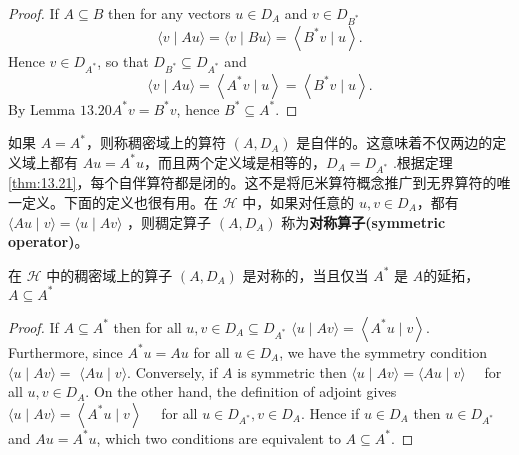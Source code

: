 \begin{proof}

If \(A \subseteq B\) then for any vectors \(u \in D_{A}\) and \(v \in D_{B^{*}}\)
\[
\langle v \mid A u\rangle=\langle v \mid B u\rangle=\left\langle B^{*} v \mid u\right\rangle .
\]
Hence \(v \in D_{A^{*}}\), so that \(D_{B^{*}} \subseteq D_{A^{*}}\) and
\[
\langle v \mid A u\rangle=\left\langle A^{*} v \mid u\right\rangle=\left\langle B^{*} v \mid u\right\rangle .
\]
By Lemma \(13.20 A^{*} v=B^{*} v\), hence \(B^{*} \subseteq A^{*}\).
    
\end{proof}
如果 \(A=A^{*}\)，则称稠密域上的算符 \(\left(A, D_{A}\right)\) 是自伴的。这意味着不仅两边的定义域上都有 \(A u=A^{*} u\)，而且两个定义域是相等的，\(D_{A}=D_{A^{*}}\) .根据定理 \ref{thm:13.21}，每个自伴算符都是闭的。这不是将厄米算符概念推广到无界算符的唯一定义。下面的定义也很有用。在 \(\mathcal{H}\) 中，如果对任意的 \(u, v \in D_{A}\)，都有 \(\langle A u \mid v\rangle=\langle u \mid A v\rangle\) ，则稠定算子 \(\left(A, D_{A}\right)\) 称为\textbf{对称算子(symmetric operator)}。
\begin{theorem}
    在 \(\mathcal{H}\) 中的稠密域上的算子 \(\left(A, D_{A}\right)\) 是对称的，当且仅当 \(A^{*}\) 是 \(A\)的延拓，\(A \subseteq A^{*}\) \label{thm:13.23}
\end{theorem}
\begin{proof}
If \(A \subseteq A^{*}\) then for all \(u, v \in D_{A} \subseteq D_{A^{*}}\)
\(\langle u \mid A v\rangle=\left\langle A^{*} u \mid v\right\rangle .\)
Furthermore, since \(A^{*} u=A u\) for all \(u \in D_{A}\), we have the symmetry condition \(\langle u \mid A v\rangle=\)
\(\langle A u \mid v\rangle\).
Conversely, if \(A\) is symmetric then
\(\langle u \mid A v\rangle=\langle A u \mid v\rangle \quad\) for all \(u, v \in D_{A} .\)
On the other hand, the definition of adjoint gives
\(\langle u \mid A v\rangle=\left\langle A^{*} u \mid v\right\rangle \quad\) for all \(u \in D_{A^{*}}, v \in D_{A}\).
Hence if \(u \in D_{A}\) then \(u \in D_{A^{*}}\) and \(A u=A^{*} u\), which two conditions are equivalent to
\(A \subseteq A^{*}\).
\end{proof}
